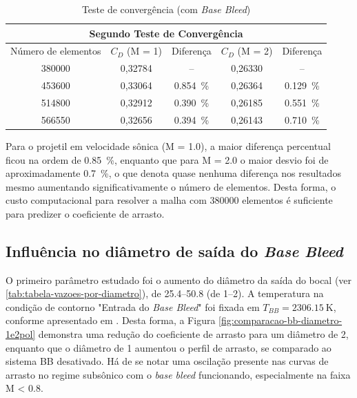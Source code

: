 \begin{table}[ht]
\centering
\caption[Teste de convergência (com \textit{Base Bleed})]{Teste de convergência (com \textit{Base Bleed})}
\vspace{0.5cm}
\begin{tabular}{c|c|c|c|c}
\multicolumn{5}{c}{Segundo Teste de Convergência} \\
\hline 
Número de elementos & \(C_{D}\) (M = \num{1}) & Diferença & \(C_{D}\) (M = \num{2}) & Diferença\\ 
\hline
\num{380000} & 0,32784 & -- & 0,26330 & --\\
\num{453600} & 0,33064 & \qty{0,854}{\percent} & 0,26364 & \qty{0,129}{\percent}\\
\num{514800} & 0,32912 & \qty{0,390}{\percent} & 0,26185 & \qty{0,551}{\percent}\\
\num{566550} & 0,32656 & \qty{0,394}{\percent} & 0,26143 & \qty{0,710}{\percent}\\
\end{tabular}
\label{tab:tabela-malhas-convergencia}
\end{table}

Para o projetil em velocidade sônica (M = \num{1,0}), a maior diferença percentual ficou na ordem de \qty{0,85}{\percent}, enquanto que para M = \num{2,0} o maior desvio foi de aproximadamente \qty{0,7}{\percent}, o que denota quase nenhuma diferença nos resultados mesmo aumentando significativamente o número de elementos. Desta forma, o custo computacional para resolver a malha com \num{380000} elementos é suficiente para predizer o coeficiente de arrasto.

\subsection{Influência no diâmetro de saída do \textit{Base Bleed}} \label{subsec:resultados-com-basebleed-diametros}

O primeiro parâmetro estudado foi o aumento do diâmetro da saída do bocal (ver \autoref{tab:tabela-vazoes-por-diametro}), de \qtyrange{25,4}{50,8}{\millimetre} (de \qtyrange{1}{2}{\polegada}). A temperatura na condição de contorno "Entrada do \textit{Base Bleed}"{} foi fixada em \(T_{BB} = \qty{2306,15}{\kelvin}\), conforme apresentado em \cite{Gil2020}. Desta forma, a Figura \ref{fig:comparacao-bb-diametro-1e2pol} demonstra uma redução do coeficiente de arrasto para um diâmetro de \qty{2}{\polegada}, enquanto que o diâmetro de \qty{1}{\polegada} aumentou o perfil de arrasto, se comparado ao sistema BB desativado. Há de se notar uma oscilação presente nas curvas de arrasto no regime subsônico com o \textit{base bleed} funcionando, especialmente na faixa M < \num{0,8}.

